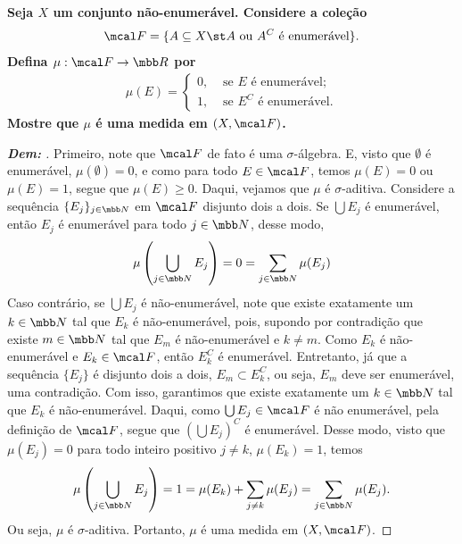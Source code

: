 \biglinend
\newpage 
{}
\bigline
\textbf{Seja $X$ um conjunto não-enumerável. Considere a coleção 
$$\mcal F = \{A \subseteq X\st  A \text{ ou } A^C \text{ é enumerável}\}.$$ Defina $\mu: \mcal F\rightarrow \mbb R$
por 
\begin{align*}
  \mu(E) = \begin{cases}
    0, &\text{ se $E$ é enumerável;}\\
    1, &\text{ se $E^C$ é enumerável.}
  \end{cases}
\end{align*}
Mostre que $\mu$ é uma medida em $(X, \mcal F)$.
}
\begin{proof}[\textbf{Dem: }]
  Primeiro, note que $\mcal F$ de fato é uma $\sigma$-álgebra. E, visto 
  que $\emptyset$ é enumerável, $\mu(\emptyset) = 0$, e como para todo $E \in \mcal F$, temos $\mu(E) = 0$ 
  ou $\mu(E) = 1$, segue que $\mu(E) \ge 0$. Daqui, vejamos que $\mu$ é $\sigma$-aditiva. 
  Considere a sequência $\{E_j\}_{j \in \mbb N}$ em $\mcal F$ disjunto dois a dois. Se $\bigcup E_j$ é enumerável, 
  então $E_j$ é enumerável para todo $j \in \mbb N$, desse modo, 
  \begin{align*}
    \mu\left(\bigcup\limits_{j \in \mbb N} E_j\right) = 0 = \sum_{j \in \mbb N} \mu(E_j)
  \end{align*}
  Caso contrário, se $\bigcup E_j$ é não-enumerável, note que existe exatamente um $k \in \mbb N$ tal que $E_k$ é 
  não-enumerável, pois, supondo por contradição que existe $m \in \mbb N$ tal que $E_m$ é não-enumerável e $k \neq m$. 
  Como $E_k$ é não-enumerável e $E_k \in \mcal F$, então $E_k^C$ é enumerável. Entretanto, já que a sequência $\{E_j\}$
  é disjunto dois a dois, $E_m \subset E_k^C$, ou seja, $E_m$ deve ser enumerável, uma contradição. Com isso, garantimos 
  que existe exatamente um $k \in \mbb N$ tal que $E_k$ é não-enumerável. Daqui, como $\bigcup E_j \in \mcal F$ é não enumerável,
  pela definição de $\mcal F$, segue que 
  $\left(\bigcup E_j\right)^C$ é enumerável. Desse modo, visto que $\mu(E_j) = 0$ para todo 
  inteiro positivo $j \neq k$, $\mu(E_k) = 1$, temos
  \begin{align*}
    \mu\left(\bigcup\limits_{j \in \mbb N} E_j\right) = 1 = \mu(E_k) + \sum_{j \neq k} \mu(E_j) 
    = \sum_{j \in \mbb N} \mu(E_j).
  \end{align*}
  Ou seja, $\mu$ é $\sigma$-aditiva. Portanto, $\mu$ é uma medida em $(X, \mcal F)$.
\end{proof}


